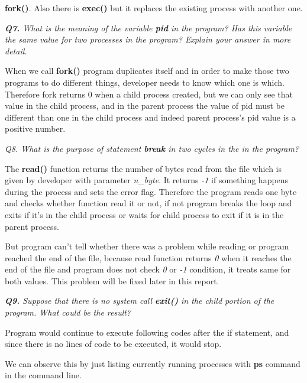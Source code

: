 \documentclass[11pt]{article}
\begin{document}
\textbf{fork()}. Also there is \textbf{exec()} but it replaces the existing process with another one.

\vspace{5mm}
\textit{\textbf{Q7.} What is the meaning of the variable \textbf{pid} in the program? Has this variable the same value for two processes in the program? Explain your answer in more detail.}
\vspace{5mm}

When we call \textbf{fork()} program duplicates itself and in order to make those two programs to do different things, developer needs to know which one is which. Therefore fork returns 0 when a child process created, but we can only see that value in the child process, and in the parent process the value of pid must be different than one in the child process and indeed parent process's pid value is a positive number.

\vspace{5mm}
\textit{Q8. What is the purpose of statement \textbf{break} in two cycles in the in the program?}
\vspace{5mm}

The \textbf{read()} function returns the number of bytes read from the file which is given by developer with parameter \textit{n\_byte}. It returns \textit{-1} if something happens during the process and sets the error flag. Therefore the program reads one byte and checks whether function read it or not, if not program breaks the loop and exits if it's in the child process or waits for child process to exit if it is in the parent process. 

But program can't tell whether there was a problem while reading or program reached the end of the file, because read function returns \textit{0} when it reaches the end of the file and program does not check \textit{0} or \textit{-1} condition, it treats same for both values. This problem will be fixed later in this report.


\vspace{5mm}
\textit{\textbf{Q9.} Suppose that there is no system call \textbf{exit()} in the child portion of the program. What could be the result?}
\vspace{5mm}

Program would continue to execute following codes after the if statement, and since there is no lines of code to be executed, it would stop. 

We can observe this by just listing currently running processes with \textbf{ps} command in the command line.
\end{document}
